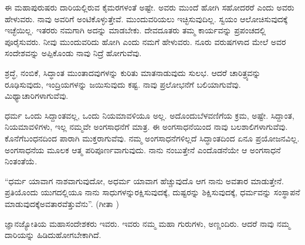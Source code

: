 ಈ ಮಹಾಪುರುಷರು ದಾರಿಯಲ್ಲಿರುವ ಕೈಮರಗಳಂತೆ ಅಷ್ಟೇ. ಅವರು ಮುಂದೆ ಹೋಗಿ ಸಹೋದರರೆ ಎಂದು ಅವರು ಹೇಳುವರು. ನಾವು ಅವರಿಗೆ ಅಂಟಿಕೊಳ್ಳುತ್ತೇವೆ. ಮುಂದುವರಿಯಲು ಇಚ್ಛಿಸುವುದಿಲ್ಲ. ಸ್ವಯಂ ಆಲೋಚಿಸುವುದಕ್ಕೆ ಇಚ್ಛೆಯಿಲ್ಲ. ಇತರರು ನಮಗಾಗಿ ಅದನ್ನು ಮಾಡಬೇಕು. ದೇವದೂತರು ತಮ್ಮ ಕಾರ್ಯವನ್ನು ಪ್ರಪಂಚದಲ್ಲಿ ಪೂರೈಸುವರು. ನೀವು ಮುಂದುವರಿದು ಹೋಗಿ ಎಂದು ನಮಗೆ ಹೇಳುವರು. ನೂರು ವರುಷಗಳಾದ ಮೇಲೆ ಅವರ ಸಂದೇಶವನ್ನು ಅಪ್ಪಿಕೊಂಡು ನಾವು ನಿದ್ರೆ ಹೋಗುವೆವು.

ಶ್ರದ್ಧೆ, ನಂಬಿಕೆ, ಸಿದ್ಧಾಂತ ಮುಂತಾದವುಗಳನ್ನು ಕುರಿತು ಮಾತನಾಡುವುದು ಸುಲಭ. ಆದರೆ ಚಾರಿತ್ರ್ಯವನ್ನು ರೂಢಿಸುವುದು, ಇಂದ್ರಿಯಗಳನ್ನು ಜಯಿಸುವುದು ಕಷ್ಟ. ನಾವು ಪ್ರಲೋಭನೆಗೆ ಬಲಿಯಾಗುವೆವು. ಮಿಥ್ಯಾಚಾರಿಗಳಾಗುವೆವು.

ಧರ್ಮ ಒಂದು ಸಿದ್ದಾಂತವಲ್ಲ, ಒಂದು ನಿಯಮಾವಳಿಯೂ ಅಲ್ಲ. ಅದೊಂದು\break ಬೆಳವಣಿಗೆಯ ಕ್ರಮ, ಅಷ್ಟೇ. ಸಿದ್ದಾಂತ, ನಿಯಮಾವಳಿಗಳು, ಇಲ್ಲ ನಮ್ಮವೇ ಅಂಗಸಾಧನೆಗೆ ಮಾತ್ರ. ಈ ಅಂಗಸಾಧನೆಯಿಂದ ನಾವು ಬಲಶಾಲಿಗಳಾಗುವೆವು. ಕೊನೆಗೆ\break ಬಂಧನದಿಂದ ಪಾರಾಗಿ ಮುಕ್ತರಾಗುವೆವು. ನಮ್ಮ ಅಂಗಸಾಧನೆಗಳಿಲ್ಲದೆ ಸಿದ್ಧಾಂತದಿಂದ ಏನೂ ಪ್ರಯೋಜನವಿಲ್ಲ. ಅಂಗಸಾಧನೆಯ ಮೂಲಕ ಆತ್ಮ ಪರಿಪೂರ್ಣವಾಗುವುದು. ನಾನು ನಂಬುತ್ತೇನೆ ಎಂದೊಡನೆಯೇ ಆ ಅಂಗಸಾಧನೆ ನಿಂತಂತೆಯೆ.

“ಧರ್ಮ ಯಾವಾಗ ನಾಶವಾಗುವುದೋ, ಅಧರ್ಮ ಯಾವಾಗ ಹೆಚ್ಚುವುದೊ ಆಗ ನಾನು ಅವತಾರ ಮಾಡುತ್ತೇನೆ. ಪ್ರತಿಯೊಂದು ಯುಗದಲ್ಲಿಯೂ ನಾನು ಸಾಧುಗಳನ್ನು\break ರಕ್ಷಿಸುವುದಕ್ಕೆ, ದುಷ್ಟರನ್ನು ಶಿಕ್ಷಿಸುವುದಕ್ಕೆ, ಧರ್ಮವನ್ನು ಸಂಸ್ಥಾಪನೆ ಮಾಡುವುದಕ್ಕೆ\break ಅವತಾರವೆತ್ತುವೆನು”. (ಗೀತಾ )

ಜ್ಞಾನಜ್ಯೋತಿಯ ಮಹಾಸಂದೇಶಕರು ಇವರು. ಇವರು ನಮ್ಮ ಮಹಾ ಗುರುಗಳು, ಅಣ್ಣಂದಿರು. ಆದರೆ ನಾವು ನಮ್ಮ ದಾರಿಯನ್ನು ಹಿಡಿದುಹೋಗಬೇಕಾಗಿದೆ.

